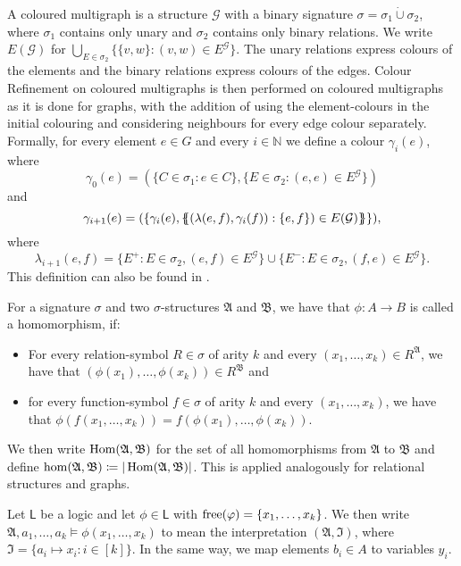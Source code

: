 A coloured multigraph is a structure $\mathcal G$ with a binary signature $\sigma=\sigma_1\operatorname{\dot{\cup}}\sigma_2$, where $\sigma_1$ contains only unary and $\sigma_2$ contains only binary relations.
We write $E(\mathcal G)$ for $\bigcup_{E\in \sigma_2} \{\{v,w \} : (v,w)\in E^{\mathcal G}\}$.
The unary relations express colours of the elements and the binary relations express colours of the edges.
Colour Refinement on coloured multigraphs is then performed on coloured multigraphs as it is done for graphs, with the addition of using the element-colours in the initial colouring and considering neighbours for every edge colour separately.
Formally, for every element $e\in G$ and every $i\in \mathbb N$ we define a colour $\gamma_i(e)$, where
$$\gamma_0(e)=(\{C\in \sigma_1 : e\in C\}, \{E\in \sigma_2 : (e,e)\in E^{\mathcal G}\})$$
and 
$$\gamma_{i+1}(e)=(\{\gamma_i(e), \left\{\kern-.35em\left\{(\lambda(e,f), \gamma_i(f)) : \{e,f\})\in E(\mathcal G)\right\}\kern-.35em\right\}\}),$$
where
$$\lambda_{i+1}(e,f)=\{E^+ : E\in\sigma_2, (e,f)\in E^{\mathcal G}\} \cup \{E^- : E\in \sigma_2, (f,e)\in E^{\mathcal G}\}.$$
This definition can also be found in \cite{scheidt2025ColorRefinement}.

For a signature $\sigma$ and two $\sigma$-structures $\mathfrak A$ and $\mathfrak B$, we have that $\phi:A\to B$ is called a homomorphism, if:
\begin{itemize}
	\item For every relation-symbol $R\in\sigma$ of arity $k$ and every $(x_1,\dots,x_k)\in R^{\mathfrak A}$, we have that $(\phi(x_1),\dots,\phi(x_k))\in R^{\mathfrak B}$ and
	\item for every function-symbol $f\in \sigma$ of arity $k$ and every $(x_1,\dots,x_k)$, we have that $\phi(f(x_1,\dots,x_k))=f(\phi(x_1),\dots,\phi(x_k))$.
\end{itemize}
We then write $\operatorname{Hom}(\mathfrak A, \mathfrak B)$ for the set of all homomorphisms from $\mathfrak A$ to $\mathfrak B$ and define $\hom(\mathfrak A,\mathfrak B)\coloneqq \vert\operatorname{Hom}(\mathfrak A,\mathfrak B)\vert$.
This is applied analogously for relational structures and graphs.

Let $\mathsf L$ be a logic and let $\phi\in \mathsf L$ with $\operatorname{free}(\varphi)=\{x_1,\dots,x_k\}$.
We then write $\mathfrak A,a_1,\dots,a_k\models \phi(x_1,\dots,x_k)$ to mean the interpretation $(\mathfrak A,\mathfrak I)$, where $\mathfrak I=\{a_i\mapsto x_i : i \in [k]\}$.
In the same way, we map elements $b_i\in A$ to variables $y_i$.






